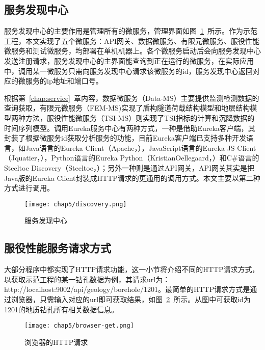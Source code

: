 \subsection{服务发现中心}

服务发现中心的主要作用是管理所有的微服务，管理界面如图~\ref{fig:服务发现中心}~所示。作为示范工程，本文实现了五个微服务：API网关、数据微服务、有限元微服务、服役性能微服务和测试微服务，均部署在单机机器上。各个微服务启动后会向服务发现中心发送注册请求，服务发现中心的主界面能查询到正在运行的微服务，在实际应用中，调用某一微服务只需向服务发现中心请求该微服务的id，服务发现中心返回对应的微服务的ip地址和端口号。

根据第~\ref{chap:service}~章内容，数据微服务（Data-MS）主要提供监测检测数据的查询获取，有限元微服务（FEM-MS)实现了盾构隧道荷载结构模型和地层结构模型两种方法，服役性能微服务（TSI-MS）则实现了TSI指标的计算和沉降数据的时间序列模型。调用Eureka服务中心有两种方式，一种是借助Eureka客户端，其封装了根据微服务id获取分析服务的功能，目前Eureka客户端已支持多种开发语言，如Java语言的Eureka Client（Apache，\citeyear{eurekaclient2018}），JavaScript语言的Eureka JS Client（Jquatier，\citeyear{eurekajsclient2018}），Python语言的Eureka Python（KristianOellegaard，\citeyear{pythoneureka2018}）和C\#语言的Steeltoe Discovery（Steeltoe，\citeyear{steeltoe2018}）；另外一种则是通过API网关，API网关其实是把Java版的Eureka Client封装成HTTP请求的更通用的调用方式。本文主要以第二种方式进行调用。

\begin{figure}[htb!]
    \centering
    \texttt{[image: chap5/discovery.png]}
    \caption{服务发现中心}
    \label{fig:服务发现中心}
\end{figure}

\subsection{服役性能服务请求方式}
\label{chap:http-request-way}

大部分程序中都实现了HTTP请求功能，这一小节将介绍不同的HTTP请求方式，以获取示范工程的某一钻孔数据为例，其请求url为：http://localhost:9002/api/geology/borehole/1201。最简单的HTTP请求方式是通过浏览器，只需输入对应的url即可获取结果，如图~\ref{fig:浏览器的HTTP请求}~所示。从图中可获取id为1201的地质钻孔所有相关数据信息。

\begin{figure}[htb!]
    \centering
    \texttt{[image: chap5/browser-get.png]}
    \caption{浏览器的HTTP请求}
    \label{fig:浏览器的HTTP请求}
\end{figure}

